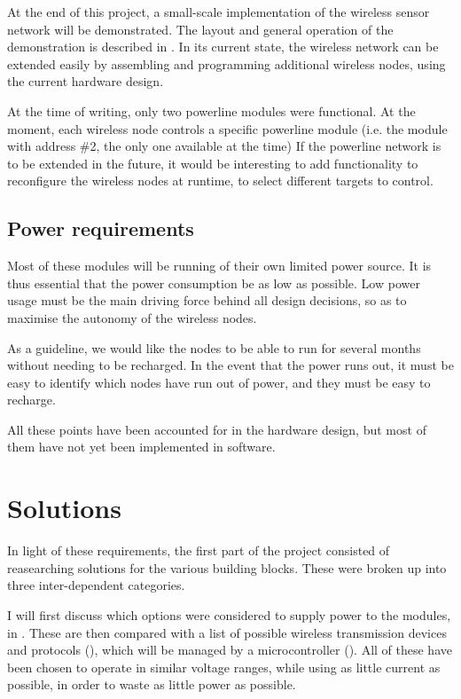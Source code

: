At the end of this project, a small-scale implementation of the wireless sensor
network will be demonstrated. The layout and general operation of the
demonstration is described in . In its current state,
the wireless network can be extended easily by assembling and programming
additional wireless nodes, using the current hardware design.

At the time of writing, only two powerline modules were functional. At the
moment, each wireless node controls a specific powerline module (i.e. the module
with address \#2, the only one available at the time) If the powerline network is
to be extended in the future, it would be interesting to add functionality to
reconfigure the wireless nodes at runtime, to select different targets to
control.

\subsection{Power requirements}
Most of these modules will be running of their own limited power source. It is
thus essential that the power consumption be as low as possible. Low power usage
must be the main driving force behind all design decisions, so as to maximise
the autonomy of the wireless nodes. 

As a guideline, we would like the nodes to be able to run for several months
without needing to be recharged. In the event that the power runs out, it must
be easy to identify which nodes have run out of power, and they must be easy to
recharge. 

All these points have been accounted for in the hardware design, but most of
them have not yet been implemented in software. 

\section{Solutions}
In light of these requirements, the first part of the project consisted of
reasearching solutions for the various building blocks. These were broken up
into three inter-dependent categories. 

I will first discuss which options were considered to supply power to the
modules, in . These are then compared with a list of
possible wireless transmission devices and protocols (), which
will be managed by a microcontroller (). All of these
have been chosen to operate in similar voltage ranges, while using as little
current as possible, in order to waste as little power as possible.

